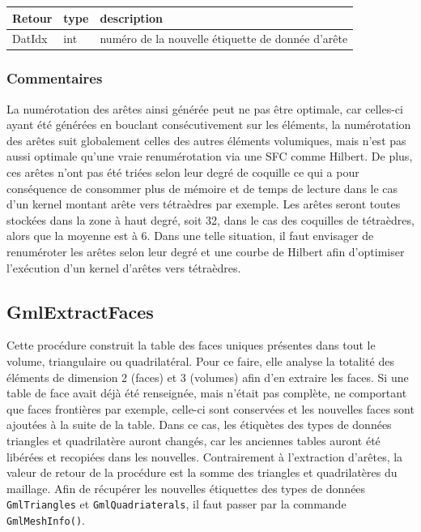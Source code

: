 \documentclass[a4paper,12pt]{article}
\begin{document}
\medskip

\begin{tabular}{|m{2cm}|m{1.5cm}|m{10.5cm}|}
\hline
Retour     & type   & description \\
\hline
DatIdx     & int    & numéro de la nouvelle étiquette de donnée d'arête\\
\hline
\end{tabular}

\subsubsection*{Commentaires}
La numérotation des arêtes ainsi générée peut ne pas être optimale, car celles-ci ayant été générées en bouclant consécutivement sur les éléments, la numérotation des arêtes suit globalement celles des autres éléments volumiques, mais n'est pas aussi optimale qu'une vraie renumérotation via une SFC comme Hilbert.
De plus, ces arêtes n'ont pas été triées selon leur degré de coquille ce qui a pour conséquence de consommer plus de mémoire et de temps de lecture dans le cas d'un kernel montant arête vers tétraèdres par exemple.
Les arêtes seront toutes stockées dans la zone à haut degré, soit 32, dans le cas des coquilles de tétraèdres, alors que la moyenne est à 6.
Dans une telle situation, il faut envisager de renuméroter les arêtes selon leur degré et une courbe de Hilbert afin d’optimiser l'exécution d'un kernel d'arêtes vers tétraèdres.


\subsection{GmlExtractFaces}
Cette procédure construit la table des faces uniques présentes dans tout le volume, triangulaire ou quadrilatéral.
Pour ce faire, elle analyse la totalité des éléments de dimension 2 (faces) et 3 (volumes) afin d'en extraire les faces.
Si une table de face avait déjà été renseignée, mais n'était pas complète, ne comportant que faces frontières par exemple, celle-ci sont conservées et les nouvelles faces sont ajoutées à la suite de la table. Dans ce cas, les étiquètes des types de données triangles et quadrilatère auront changés, car les anciennes tables auront été libérées et recopiées dans les nouvelles. Contrairement à l'extraction d'arêtes, la valeur de retour de la procédure est la somme des triangles et quadrilatères du maillage. Afin de récupérer les nouvelles étiquettes des types de données {\tt GmlTriangles} et {\tt GmlQuadriaterals}, il faut passer par la commande {\tt GmlMeshInfo()}.
\end{document}
